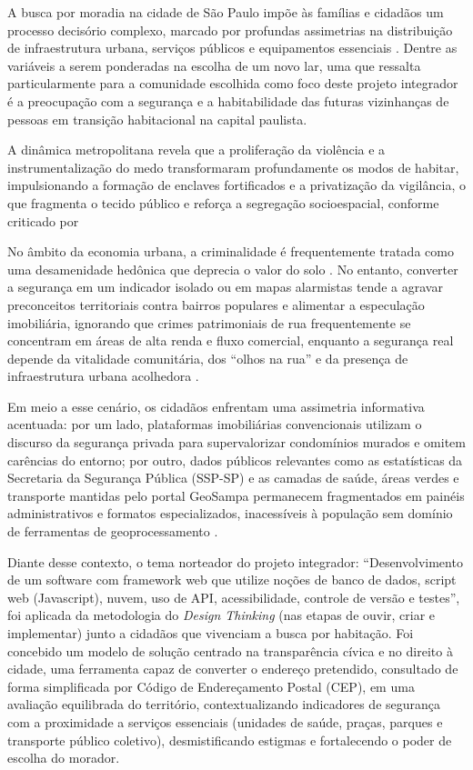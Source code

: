 \documentclass[
    12pt,
    oneside,            %
    a4paper,
    brazilian
    ]{abntex2}
\begin{document}
A busca por moradia na cidade de São Paulo impõe às famílias e cidadãos um processo decisório complexo, marcado por profundas assimetrias na distribuição de infraestrutura urbana, serviços públicos e equipamentos essenciais \cite{caldeira2000}. Dentre as variáveis a serem ponderadas na escolha de um novo lar, uma que ressalta particularmente para a comunidade escolhida como foco deste projeto integrador é a preocupação com a segurança e a habitabilidade das futuras vizinhanças de pessoas em transição habitacional na capital paulista.

A dinâmica metropolitana revela que a proliferação da violência e a instrumentalização do medo transformaram profundamente os modos de habitar, impulsionando a formação de enclaves fortificados e a privatização da vigilância, o que fragmenta o tecido público e reforça a segregação socioespacial, conforme criticado por 

No âmbito da economia urbana, a criminalidade é frequentemente tratada como uma desamenidade hedônica que deprecia o valor do solo \cite{teixeira2016}\footnotemark. No entanto, converter a segurança em um indicador isolado ou em mapas alarmistas tende a agravar preconceitos territoriais contra bairros populares e alimentar a especulação imobiliária, ignorando que crimes patrimoniais de rua frequentemente se concentram em áreas de alta renda e fluxo comercial, enquanto a segurança real depende da vitalidade comunitária, dos ``olhos na rua'' e da presença de infraestrutura urbana acolhedora \cite{jacobs2011,nev2024}.

Em meio a esse cenário, os cidadãos enfrentam uma assimetria informativa acentuada: por um lado, plataformas imobiliárias convencionais utilizam o discurso da segurança privada para supervalorizar condomínios murados e omitem carências do entorno; por outro, dados públicos relevantes como as estatísticas da Secretaria da Segurança Pública (SSP-SP) e as camadas de saúde, áreas verdes e transporte mantidas pelo portal GeoSampa permanecem fragmentados em painéis administrativos e formatos especializados, inacessíveis à população sem domínio de ferramentas de geoprocessamento \cite{ssp2024,geosampa2024,cem2021}.

Diante desse contexto, o tema norteador do projeto integrador: ``Desenvolvimento de um software com framework web que utilize noções de banco de dados, script web (Javascript), nuvem, uso de API, acessibilidade, controle de versão e testes'', foi aplicada da metodologia do \emph{Design Thinking} (nas etapas de ouvir, criar e implementar) junto a cidadãos que vivenciam a busca por habitação. Foi concebido um modelo de solução centrado na transparência cívica e no direito à cidade, uma ferramenta capaz de converter o endereço pretendido, consultado de forma simplificada por Código de Endereçamento Postal (CEP), em uma avaliação equilibrada do território, contextualizando indicadores de segurança com a proximidade a serviços essenciais (unidades de saúde, praças, parques e transporte público coletivo), desmistificando estigmas e fortalecendo o poder de escolha do morador.
\end{document}
